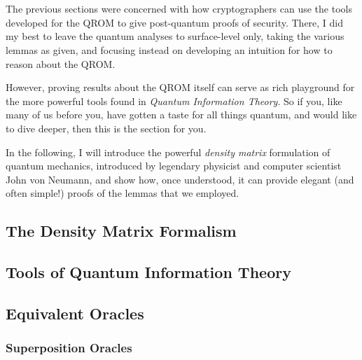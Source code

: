\section{\titleProofs}\label{sec:proofs}
  The previous sections were concerned with how cryptographers 
    can use the tools developed for the QROM to give
    post-quantum proofs of security. There, I did my best to leave the quantum
    analyses to surface-level only, taking the various lemmas as given, and focusing
    instead on developing an intuition for how to reason about the QROM.

  However, proving results about the QROM itself can serve as 
    rich playground for the more powerful tools found in \emph{Quantum
    Information Theory}. So if you, like
    many of us before you, have gotten a
    taste for all things quantum, and would
    like to dive deeper, then this is the section for you.

  In the following, I will introduce the powerful \emph{density matrix}
    formulation of quantum mechanics, introduced by legendary physicist and
    computer scientist John von Neumann, and show how, once understood, 
    it can provide elegant (and often simple!) proofs of the lemmas that we
    employed.

  
  \subsection{The Density Matrix Formalism}

  \subsection{Tools of Quantum Information Theory}

  \subsection{Equivalent Oracles}
    \subsubsection{Superposition Oracles}

